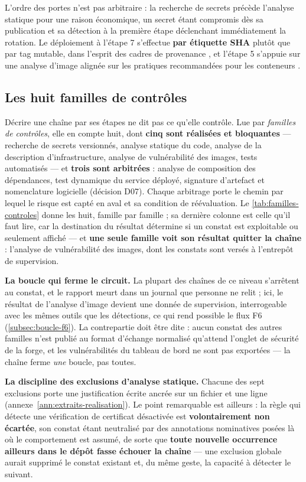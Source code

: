 L'ordre des portes n'est pas arbitraire : la recherche de secrets \cite{gitguardian_sprawl} précède
l'analyse statique pour une raison économique, un secret étant compromis dès sa publication et sa
détection à la première étape déclenchant immédiatement la rotation. Le déploiement à l'étape 7
s'effectue \textbf{par étiquette SHA} plutôt que par tag mutable, dans l'esprit des cadres de
provenance \cite{slsa_framework}, et l'étape 5 s'appuie sur une analyse d'image alignée sur les
pratiques recommandées pour les conteneurs \cite{gcp_container_best_practices}.

\subsection{Les huit familles de contrôles}
\label{subsec:familles-controles}

Décrire une chaîne par ses étapes ne dit pas ce qu'elle contrôle. Lue par \emph{familles de
contrôles}, elle en compte huit, dont \textbf{cinq sont réalisées et bloquantes} --- recherche de
secrets versionnés, analyse statique du code, analyse de la description d'infrastructure, analyse
de vulnérabilité des images, tests automatisés --- et \textbf{trois sont arbitrées} : analyse de
composition des dépendances, test dynamique du service déployé, signature d'artefact et
nomenclature logicielle (décision D07). Chaque arbitrage porte le chemin par lequel le risque est
capté en aval et sa condition de réévaluation. Le \cref{tab:familles-controles} donne les huit,
famille par famille ; sa dernière colonne est celle qu'il faut lire, car la destination du résultat
détermine si un constat est exploitable ou seulement affiché --- et \textbf{une seule famille voit
son résultat quitter la chaîne} : l'analyse de vulnérabilité des images, dont les constats sont
versés à l'entrepôt de supervision.


\textbf{La boucle qui ferme le circuit.} La plupart des chaînes de ce niveau s'arrêtent au constat,
et le rapport meurt dans un journal que personne ne relit ; ici, le résultat de l'analyse d'image
devient une donnée de supervision, interrogeable avec les mêmes outils que les détections, ce qui
rend possible le flux F6 (\cref{subsec:boucle-f6}). La contrepartie doit être dite : aucun constat
des autres familles n'est publié au format d'échange normalisé qu'attend l'onglet de sécurité de la
forge, et les vulnérabilités du tableau de bord ne sont pas exportées --- la chaîne ferme
\emph{une} boucle, pas toutes.

\textbf{La discipline des exclusions d'analyse statique.} Chacune des sept exclusions porte une
justification écrite ancrée sur un fichier et une ligne (annexe~\ref{ann:extraits-realisation}).
Le point remarquable est ailleurs : la règle qui détecte une vérification de certificat désactivée
est \textbf{volontairement non écartée}, son constat étant neutralisé par des annotations
nominatives posées là où le comportement est assumé, de sorte que \textbf{toute nouvelle occurrence
ailleurs dans le dépôt fasse échouer la chaîne} --- une exclusion globale aurait supprimé le constat
existant et, du même geste, la capacité à détecter le suivant.


